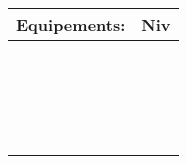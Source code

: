 \documentclass[a4paper,twocolumn]{article}
\begin{document}
\begin{landscape}
\begin{multicols}{2}
\vspace{3pt} 	

\noindent\begin{tabularx}{\columnwidth}{|X|r|}
	\hline
	\cellcolor{black!10} 
	Equipements: &
	\cellcolor{black!10} 
	Niv\\ \hline
	 & \\ \hline
	 & \\ \hline
	 & \\ \hline
	 & \\ \hline
	 & \\ \hline
	 & \\ \hline
	 & \\ \hline
	 & \\ \hline
	 & \\ \hline
	 & \\ \hline
	 & \\ \hline
	 & \\ \hline
	 & \\ \hline
	 & \\ \hline
	 & \\ \hline
	 & \\ \hline
	 & \\ \hline
	 & \\ \hline
	 & \\ \hline
\end{tabularx}

\pagebreak

\end{multicols}


\end{landscape}
\end{document}
